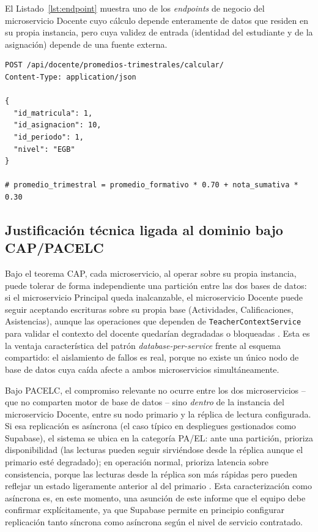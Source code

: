 \documentclass[11pt,a4paper]{article}
\begin{document}
El Listado~\ref{lst:endpoint} muestra uno de los \emph{endpoints} de negocio del microservicio Docente cuyo cálculo depende enteramente de datos que residen en su propia instancia, pero cuya validez de entrada (identidad del estudiante y de la asignación) depende de una fuente externa.

\begin{lstlisting}[caption={Endpoint de cálculo de promedio trimestral del microservicio Docente.}, label={lst:endpoint}]
POST /api/docente/promedios-trimestrales/calcular/
Content-Type: application/json

{
  "id_matricula": 1,
  "id_asignacion": 10,
  "id_periodo": 1,
  "nivel": "EGB"
}

# promedio_trimestral = promedio_formativo * 0.70 + nota_sumativa * 0.30
\end{lstlisting}

\subsection{Justificación técnica ligada al dominio bajo CAP/PACELC}

Bajo el teorema CAP, cada microservicio, al operar sobre su propia instancia, puede tolerar de forma independiente una partición entre las dos bases de datos: si el microservicio Principal queda inalcanzable, el microservicio Docente puede seguir aceptando escrituras sobre su propia base (Actividades, Calificaciones, Asistencias), aunque las operaciones que dependen de \texttt{TeacherContextService} para validar el contexto del docente quedarían degradadas o bloqueadas \cite{gilbert2002}. Esta es la ventaja característica del patrón \emph{database-per-service} frente al esquema compartido: el aislamiento de fallos es real, porque no existe un único nodo de base de datos cuya caída afecte a ambos microservicios simultáneamente.

Bajo PACELC, el compromiso relevante no ocurre entre los dos microservicios -- que no comparten motor de base de datos -- sino \emph{dentro} de la instancia del microservicio Docente, entre su nodo primario y la réplica de lectura configurada. Si esa replicación es asíncrona (el caso típico en despliegues gestionados como Supabase), el sistema se ubica en la categoría PA/EL: ante una partición, prioriza disponibilidad (las lecturas pueden seguir sirviéndose desde la réplica aunque el primario esté degradado); en operación normal, prioriza
latencia sobre consistencia, porque las lecturas desde la réplica son más rápidas pero pueden reflejar un estado ligeramente anterior al del primario \cite{abadi2012}. Esta caracterización como asíncrona es, en este momento, una asunción de este informe que el equipo debe confirmar explícitamente, ya que Supabase permite en principio configurar replicación tanto síncrona como asíncrona según el nivel de servicio contratado.
\end{document}
